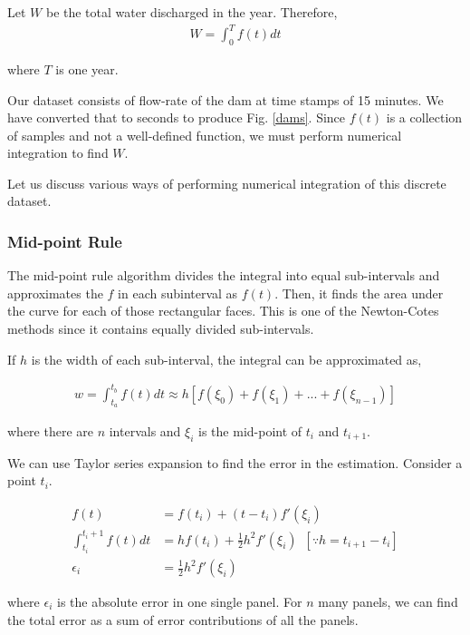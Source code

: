 Let $W$ be the total water discharged in the year. Therefore,
\begin{align}
    W = \int_{0}^{T} f(t) dt
\end{align}

where $T$ is one year.

Our dataset consists of flow-rate of the dam at time stamps of 15 minutes. We have converted that to seconds to produce Fig. \ref{dams}. Since $f(t)$ is a collection of samples and not a well-defined function, we must perform numerical integration to find $W$.


Let us discuss various ways of performing numerical integration of this discrete dataset.

\subsubsection{Mid-point Rule}
The mid-point rule algorithm divides the integral into equal sub-intervals and approximates the $f$ in each subinterval as $f(t)$. Then, it finds the area under the curve for each of those rectangular faces. This is one of the Newton-Cotes methods since it contains equally divided sub-intervals. 

If $h$ is the width of each sub-interval, the integral can be approximated as,

\begin{align}
    w = \int_{t_a}^{t_b} f(t) dt \approx h[f(\xi_0) + f(\xi_1) + ... + f(\xi_{n-1})]
\end{align}

where there are $n$ intervals and $\xi_i$ is the mid-point of $t_i$ and $t_{i+1}$.

We can use Taylor series expansion to find the error in the estimation. Consider a point $t_i$.

\begin{align}
    f(t) &= f(t_i) + (t-t_i)f'(\xi_i)\nonumber\\
    \int_{t_i}^{t_i+1} f(t)dt &= hf(t_i) + \frac{1}{2}h^2f'(\xi_i)\nonumber\,\,\, \left[\because h = t_{i+1}-t_i\right] \\
    \epsilon_i &= \frac{1}{2}h^2f'(\xi_i)
\end{align}

where $\epsilon_i$ is the absolute error in one single panel. For $n$ many panels, we can find the total error as a sum of error contributions of all the panels.

